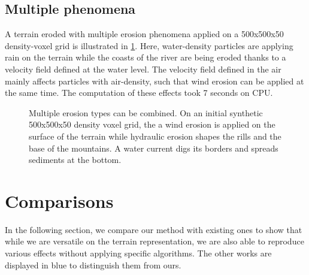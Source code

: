 \subsection{Multiple phenomena} 
A terrain eroded with multiple erosion phenomena applied on a 500x500x50 density-voxel grid is illustrated in \cref{fig:erosion_multiErosions}. Here, water-density particles are applying rain on the terrain while the coasts of the river are being eroded thanks to a velocity field defined at the water level. The velocity field defined in the air mainly affects particles with air-density, such that wind erosion can be applied at the same time. The computation of these effects took 7 seconds on CPU.

\begin{figure}[ht]
    \caption{Multiple erosion types can be combined. On an initial synthetic 500x500x50 density voxel grid, the a wind erosion is applied on the surface of the terrain while hydraulic erosion shapes the rills and the base of the mountains. A water current digs its borders and spreads sediments at the bottom. }
    \label{fig:erosion_multiErosions}
\end{figure}

\section{Comparisons}
In the following section, we compare our method with existing ones to show that while we are versatile on the terrain representation, we are also able to reproduce various effects without applying specific algorithms. The other works are displayed in blue to distinguish them from ours.

